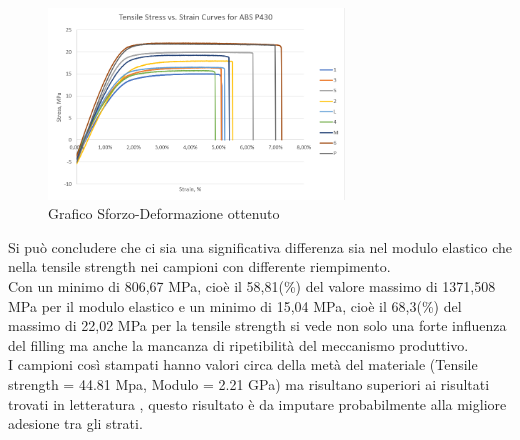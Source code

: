 \documentclass[%
corpo=11pt,
twoside,
 stile=classica,
oldstyle,
greek,%
]{toptesi}
\begin{document}
	\begin{figure}
	\centering
	\includegraphics[width=0.7\textwidth]{Screen/curvesmaterial.png}
	\caption{Grafico Sforzo-Deformazione ottenuto }
	\label{fig:graficomateriale}
\end{figure} 

Si può concludere che ci sia una significativa differenza sia nel modulo elastico che nella tensile strength nei campioni con differente riempimento. \\
Con un minimo di 806,67 MPa, cioè il 58,81(\%) del valore massimo di 1371,508 MPa per il modulo elastico e un minimo di 15,04 MPa, cioè il 68,3(\%) del massimo di 22,02 MPa per la tensile strength si vede non solo una forte influenza del filling ma anche la mancanza di ripetibilità del meccanismo produttivo. \\
I campioni così stampati hanno valori circa della metà del materiale (Tensile strength = 44.81 Mpa, Modulo = 2.21 GPa) ma risultano superiori ai risultati trovati in letteratura \cite{P430paper}, questo risultato è da imputare probabilmente alla migliore adesione tra gli strati.
\end{document}
